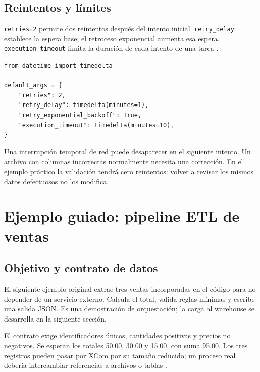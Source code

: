 \documentclass[12pt]{article}
\begin{document}
\subsection{Reintentos y límites}
\texttt{retries=2} permite dos reintentos después del intento inicial. \texttt{retry\_delay} establece la espera base; el retroceso exponencial aumenta esa espera. \texttt{execution\_timeout} limita la duración de cada intento de una tarea \cite{airflow_tasks}.
\begin{lstlisting}[style=python]
from datetime import timedelta

default_args = {
    "retries": 2,
    "retry_delay": timedelta(minutes=1),
    "retry_exponential_backoff": True,
    "execution_timeout": timedelta(minutes=10),
}
\end{lstlisting}
Una interrupción temporal de red puede desaparecer en el siguiente intento. Un archivo con columnas incorrectas normalmente necesita una corrección. En el ejemplo práctico la validación tendrá cero reintentos: volver a revisar los mismos datos defectuosos no los modifica.

\section{Ejemplo guiado: pipeline ETL de ventas}
\subsection{Objetivo y contrato de datos}
El siguiente ejemplo original extrae tres ventas incorporadas en el código para no depender de un servicio externo. Calcula el total, valida reglas mínimas y escribe una salida JSON. Es una demostración de orquestación; la carga al warehouse se desarrolla en la siguiente sección.

El contrato exige identificadores únicos, cantidades positivas y precios no negativos. Se esperan los totales 50.00, 30.00 y 15.00, con suma 95.00. Los tres registros pueden pasar por XCom por su tamaño reducido; un proceso real debería intercambiar referencias a archivos o tablas \cite{airflow_xcom}.
\end{document}
